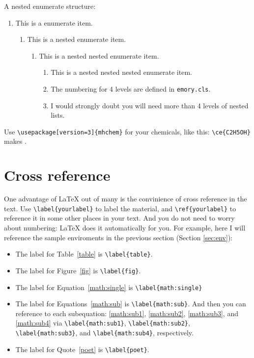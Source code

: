 \documentclass[draft,twoside]{emory}
\begin{document}
A nested enumerate structure:
\begin{enumerate}
  \item This is a enumerate item.
  \begin{enumerate}
    \item This is a nested enumerate item.
    \begin{enumerate}
      \item This is a nested nested enumerate item.
      \begin{enumerate}
        \item This is a nested nested nested enumerate item. 
        \item The numbering for 4 levels are defined in \verb|emory.cls|.
        \item I would strongly doubt you will need more than 4 levels of nested lists.
      \end{enumerate}
    \end{enumerate}
  \end{enumerate}    
\end{enumerate}


Use \verb|\usepackage[version=3]{mhchem}| for your chemicals, like this:
\verb|\ce{C2H5OH}| makes .


\section{Cross reference}
One advantage of \LaTeX{} out of many is the convinience of cross reference in
the text. Use \verb|\label{yourlabel}| to label the material, and \verb|\ref{yourlabel}|
to reference it in some other places in your text. And you do not need to worry
about numbering: \LaTeX{} does it automatically for you. For example, here
I will reference the sample enviroments in the previous section (Section \ref{sec:env}):
\begin{itemize}
\item The label for Table~\ref{table} is \verb|\label{table}|.
\item The label for Figure~\ref{fig} is \verb|\label{fig}|.
\item The label for Equation~\ref{math:single} is \verb|\label{math:single}|
\item The label for Equations~\ref{math:sub} is \verb|\label{math:sub}|. And then
      you can reference to each subequation: \ref{math:sub1}, \ref{math:sub2}, 
      \ref{math:sub3}, and \ref{math:sub4} via \verb|\label{math:sub1}|,
      \verb|\label{math:sub2}|, \verb|\label{math:sub3}|, and \verb|\label{math:sub4}|,
      respectively.
\item The label for Quote~\ref{poet} is \verb|\label{poet}|.
\end{itemize}
\end{document}
